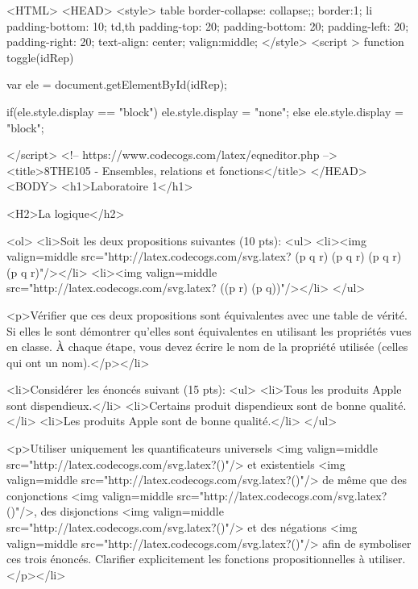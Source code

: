 <HTML>
	<HEAD>
	<style>
	table{
		border-collapse: collapse;;
		border:1;
	}
	li {
		padding-bottom: 10;
	}
	td,th {
		padding-top: 20;
		padding-bottom: 20;
		padding-left: 20;
		padding-right: 20;
		text-align: center;	
		valign:middle;		
	}
	</style>
	<script > 
		function toggle(idRep) {
			var ele = document.getElementById(idRep);
			
			if(ele.style.display == "block") {
					ele.style.display = "none";		
			}
			else {
				ele.style.display = "block";
			}
		} 
	</script>
	<!-- https://www.codecogs.com/latex/eqneditor.php -->
	<title>8THE105 - Ensembles, relations et fonctions</title>
	</HEAD>
	<BODY>
	<h1>Laboratoire 1</h1>
	
	<H2>La logique</h2>
	
	<ol>
	<li>Soit les deux propositions suivantes (10 pts):
	<ul>
		<li><img valign=middle src="http://latex.codecogs.com/svg.latex?
		\left(\neg p \wedge \neg q 	\wedge r\right) \vee  
		\left(\neg p \wedge q 		\wedge r\right) \vee
		\left(p 	\wedge \neg q 	\wedge \neg r\right) \vee
		\left(p 	\wedge \neg q 	\wedge r\right)"/></li>
		<li><img valign=middle src="http://latex.codecogs.com/svg.latex?
		\neg\left(\left(p \vee \neg r\right) \wedge \left(\neg p \vee q\right)\right)"/></li>
	</ul>                                                 
	
	<p>Vérifier que ces deux propositions sont équivalentes avec une table de vérité.  Si elles le sont démontrer qu'elles sont équivalentes en utilisant les propriétés vues en classe.  À chaque étape, vous devez écrire le nom de la propriété utilisée (celles qui ont un nom).</p></li>
	
	<li>Considérer les énoncés suivant (15 pts):
	<ul>
		<li>Tous les produits Apple sont dispendieux.</li>
		<li>Certains produit dispendieux sont de bonne qualité.</li>
		<li>Les produits Apple sont de bonne qualité.</li>
	</ul>

	<p>Utiliser uniquement les quantificateurs universels 
	<img valign=middle src="http://latex.codecogs.com/svg.latex?(\forall)"/> et existentiels <img valign=middle src="http://latex.codecogs.com/svg.latex?(\exists)"/> de même que des conjonctions 
	<img valign=middle src="http://latex.codecogs.com/svg.latex?(\wedge)"/>,  des disjonctions <img valign=middle src="http://latex.codecogs.com/svg.latex?(\vee)"/> et des négations <img valign=middle src="http://latex.codecogs.com/svg.latex?(\neg)"/> afin de symboliser ces trois énoncés.  Clarifier explicitement les fonctions propositionnelles à utiliser.</p></li>
	
